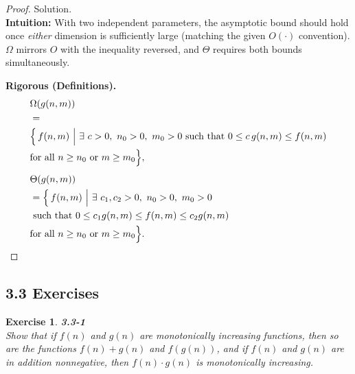 \documentclass[12pt]{article}
\newtheorem{exercise}[theorem]{Exercise}
\theoremstyle{definition}
\begin{document}
\begin{proof}
Solution. \\

\noindent
\textbf{Intuition:}  
With two independent parameters, the asymptotic bound should hold once \emph{either}
dimension is sufficiently large (matching the given $O(\cdot)$ convention). $\Omega$ mirrors
$O$ with the inequality reversed, and $\Theta$ requires both bounds simultaneously.

\noindent
\textbf{Rigorous (Definitions).}
\begin{align*}
&\Omega(g(n,m))\\
&= \\
& \Bigl\{\, f(n,m)\ \Big|\ \exists\ c>0,\ n_0>0,\ m_0>0 \text{ such that }
0 \le c\,g(n,m) \le f(n,m) \\
&\text{for all } n \ge n_0 \ \text{or}\ m \ge m_0 \Bigr\},\\[4pt]
&\Theta(g(n,m))\\
&= \Bigl\{\, f(n,m)\ \Big|\ \exists\ c_1,c_2>0,\ n_0>0,\ m_0>0 \\
&\text{ such that } 0 \le c_1 g(n,m) \le f(n,m) \le c_2 g(n,m) \\
&\text{for all } n \ge n_0 \ \text{or}\ m \ge m_0 \Bigr\}.
\end{align*}
\end{proof}

\newpage

\subsection*{3.3 Exercises}

\begin{exercise}
\noindent
\textbf{3.3-1} \\
Show that if $f(n)$ and $g(n)$ are monotonically increasing functions, then so are
the functions $f(n)+g(n)$ and $f(g(n))$, and if $f(n)$ and $g(n)$ are in addition
nonnegative, then $f(n)\cdot g(n)$ is monotonically increasing.
\end{exercise}
\end{document}
